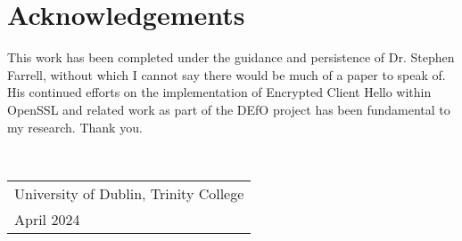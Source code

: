 \chapter*{Acknowledgements}

\begin{spacing}{1.5}
This work has been completed under the guidance and persistence of Dr. Stephen Farrell, without which I cannot say there would be much of a paper to speak of. His continued efforts on the implementation of Encrypted Client Hello within OpenSSL and related work as part of the DEfO project has been fundamental to my research. Thank you.
\end{spacing}

{
\par \vspace{20mm}
 \\[10mm]
\raggedright {{\slshape \begin{tabular}{l}University of Dublin, Trinity College \\ April 2024\end{tabular}}}
}

